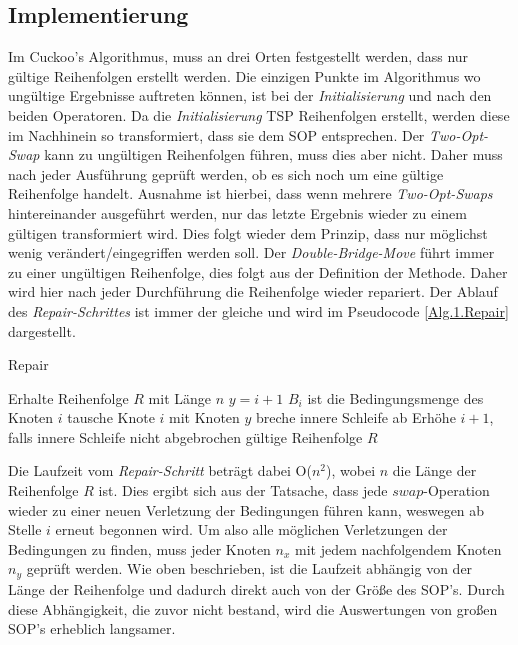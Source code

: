 \documentclass[conference]{IEEEtran}
\begin{document}
    \subsection{Implementierung} \label{Implementierung Repair}
      Im Cuckoo's Algorithmus, muss an drei Orten festgestellt werden, dass nur gültige Reihenfolgen erstellt werden. 
      Die einzigen Punkte im Algorithmus wo ungültige Ergebnisse auftreten können, ist bei der \textit{Initialisierung} 
      und nach den beiden Operatoren. Da die \textit{Initialisierung} TSP Reihenfolgen erstellt, werden diese im Nachhinein so 
      transformiert, dass sie dem SOP entsprechen. Der \textit{Two-Opt-Swap} kann zu ungültigen Reihenfolgen führen, muss dies aber 
      nicht. Daher muss nach jeder Ausführung geprüft werden, ob es sich noch um eine gültige Reihenfolge handelt. 
      Ausnahme ist hierbei, dass wenn mehrere \textit{Two-Opt-Swaps} hintereinander ausgeführt werden, nur das letzte Ergebnis 
      wieder zu einem gültigen transformiert wird. Dies folgt wieder dem Prinzip, dass nur möglichst wenig verändert/eingegriffen 
      werden soll. Der \textit{Double-Bridge-Move} führt immer zu einer ungültigen Reihenfolge, dies folgt aus der Definition der Methode. 
      Daher wird hier nach jeder Durchführung die Reihenfolge wieder repariert. Der Ablauf des \textit{Repair-Schrittes} ist immer 
      der gleiche und wird im Pseudocode \ref{Alg.1.Repair} dargestellt.


      
      \begin{algorithm}
        \caption{Repair}\label{Alg.1.Repair}
        \begin{algorithmic}[1]
        \State Erhalte Reihenfolge $R$ mit Länge $n$
          \State $y = i+1$
          \State $B_i$ ist die Bedingungsmenge des Knoten $i$
              \State tausche Knote $i$ mit Knoten $y$
              \State breche innere Schleife ab
            \EndIf
          \EndWhile
          \State Erhöhe $i+1$, falls innere Schleife nicht abgebrochen
        \EndWhile
        \State gültige Reihenfolge $R$
        
        \end{algorithmic}
        \end{algorithm}

      Die Laufzeit vom \textit{Repair-Schritt} beträgt dabei O($n^2$), wobei $n$ die Länge der Reihenfolge $R$ ist. Dies ergibt sich aus der Tatsache, dass
      jede $swap$-Operation wieder zu einer neuen Verletzung der Bedingungen führen kann, weswegen ab Stelle $i$ erneut begonnen wird.
      Um also alle möglichen Verletzungen der Bedingungen zu finden, muss jeder Knoten $n_x$ mit jedem nachfolgendem Knoten $n_y$ geprüft werden. 
      Wie oben beschrieben, ist die Laufzeit abhängig von der Länge der Reihenfolge und dadurch direkt auch von der Größe des SOP's. 
      Durch diese Abhängigkeit, die zuvor nicht bestand, wird die Auswertungen von großen SOP's erheblich langsamer.
  
\end{document}
